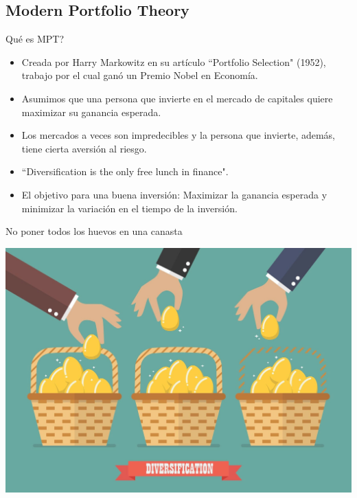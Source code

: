 \documentclass[12pt,aspectratio=169]{beamer}
\begin{document}
\subsection{Modern Portfolio Theory}

\begin{frame}{Qué es MPT?}
\begin{itemize}
\item Creada por Harry Markowitz en su artículo ``Portfolio Selection" (1952), trabajo por el cual ganó un Premio Nobel en Economía.

\item Asumimos que una persona que invierte en el mercado de capitales quiere maximizar su ganancia esperada.

\item Los mercados a veces son impredecibles y la persona que invierte, además, tiene cierta aversión al riesgo.

\item ``Diversification is the only free lunch in finance".

\item El objetivo para una buena inversión: Maximizar la ganancia esperada y minimizar la variación en el tiempo de la inversión.
\end{itemize}
\end{frame}

\begin{frame}{No poner todos los huevos en una canasta}
\begin{center}
	\includegraphics[width=.65\paperwidth]{diversification.jpg}
\end{center}
\end{frame}
\end{document}
